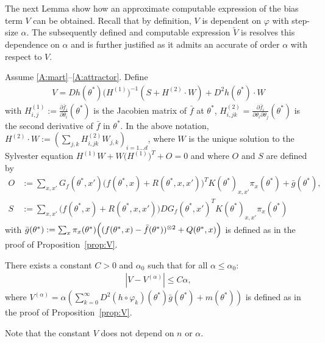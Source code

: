\documentclass{article}
\newcommand\abs[1]{\left|#1\right|}
\newcommand\toA{^{(\alpha)}}
\newcommand\barf{\bar{f}}
\begin{document}
The next Lemma show how an approximate computable expression of the bias term $V$ can be obtained. Recall that by definition, $V$ is dependent on $\varphi$ with step-size $\alpha$. The subsequently defined and  computable expression $\tilde{V}$ is resolves this dependence on $\alpha$ and is further justified as it admits an accurate of order $\alpha$ with respect to $V$.
\begin{lemma}
    \label{lem:computable}
    Assume \ref{A:mart}--\ref{A:attractor}. Define 
    \begin{align}
        V = D h(\theta^*) \bigl(H^{(1)}\bigr)^{-1} ( S + H^{(2)} \cdot W) + D^2 h(\theta^*) \cdot W \label{eq:definition_Ch}
    \end{align}
    with $H^{(1)}_{i,j} := \frac{\partial \barf_i}{\partial \theta_i}(\theta^*)$ is the Jacobien matrix of $\barf$ at $\theta^*$, $H^{(2)}_{i,jk} = \frac{\partial \barf_i}{\partial \theta_i\partial \theta_j}(\theta^*)$ is the second derivative of $\barf$ in $\theta^*$. In the above notation, $H^{(2)} \cdot W := (\sum_{j,k} H^{(2)}_{i,jk} W_{j,k})_{i=1...d}$, where $W$ is the unique solution to the Sylvester equation $H^{(1)}W + W\bigl(H^{(1)}\bigr)^T + O = 0$ and where $O$ and $S$ are defined by
    \begin{align}
        O & := \sum_{x,x'} G_f (\theta^*, x') \bigl(f(\theta^*, x) + R(\theta^*,x,x')\bigr)^T K(\theta^*)_{x,x'}\pi_x(\theta^*)   + \bar{g}(\theta^*), \label{eq:def_O}\\
        S & := \sum_{x,x'} \bigl( f(\theta^*, x) + R(\theta^*,x,x') \bigr) DG_f (\theta^*, x')^T K(\theta^*)_{x,x'} \pi_x(\theta^*) \label{eq:def_S}
    \end{align}
    with  $\bar{g}(\theta^*) := \sum_x \pi_x(\theta^*)\Bigr((f(\theta^*,x) - \barf(\theta^*))^{\otimes2} + Q(\theta^*, x)\Bigl)$ is defined as in the proof of Proposition~\ref{prop:V}.

    There exists a constant $C>0$ and $\alpha_0$ such that for all $\alpha\le\alpha_0$:
    \begin{align*}
        \abs{V-V\toA}\le C\alpha,
    \end{align*}
    where $V\toA = \alpha(\sum_{k=0}^{\infty} D^2(h\circ\varphi_{k})(\theta^*)\bar{g}(\theta^*) + m(\theta^*))$ is defined as in the proof of Proposition~\ref{prop:V}.
\end{lemma}
Note that the constant $V$ does not depend on $n$ or $\alpha$.
\end{document}
